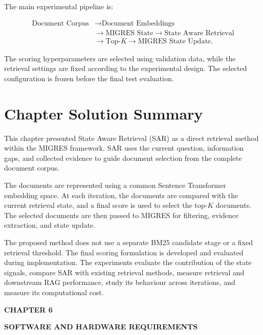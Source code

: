 \documentclass[12pt,a4paper]{report}
\newcommand{\chaptertitle}[2]{
    \begin{center}
        {\fontsize{18}{21}\selectfont\bfseries CHAPTER #1\par}
        \vspace{0.10in}
        {\fontsize{18}{21}\selectfont\bfseries #2\par}
    \end{center}
    \vspace{0.12in}
}
\begin{document}
The main experimental pipeline is:

\[
\begin{aligned}
\text{Document Corpus}
&\rightarrow \text{Document Embeddings}\\
&\rightarrow \text{MIGRES State}
\rightarrow \text{State Aware Retrieval}\\
&\rightarrow \text{Top-}K
\rightarrow \text{MIGRES State Update}.
\end{aligned}
\]

The scoring hyperparameters are selected using validation data, while
the retrieval settings are fixed according to the experimental design.
The selected configuration is frozen before the final test evaluation.

\section{Chapter Solution Summary}

This chapter presented State Aware Retrieval (SAR) as a direct retrieval
method within the MIGRES framework. SAR uses the current question,
information gaps, and collected evidence to guide document selection
from the complete document corpus.

The documents are represented using a common Sentence Transformer
embedding space. At each iteration, the documents are compared with the
current retrieval state, and a final score is used to select the
top-$K$ documents. The selected documents are then passed to MIGRES for
filtering, evidence extraction, and state update.

The proposed method does not use a separate BM25 candidate stage or a
fixed retrieval threshold. The final scoring formulation is developed
and evaluated during implementation. The experiments evaluate the
contribution of the state signals, compare SAR with existing retrieval
methods, measure retrieval and downstream RAG performance, study its
behaviour across iterations, and measure its computational cost.

\clearpage


\setcounter{table}{0}
\renewcommand{\thetable}{6.\arabic{table}}


\chaptertitle{6}{SOFTWARE AND HARDWARE REQUIREMENTS}
\end{document}
